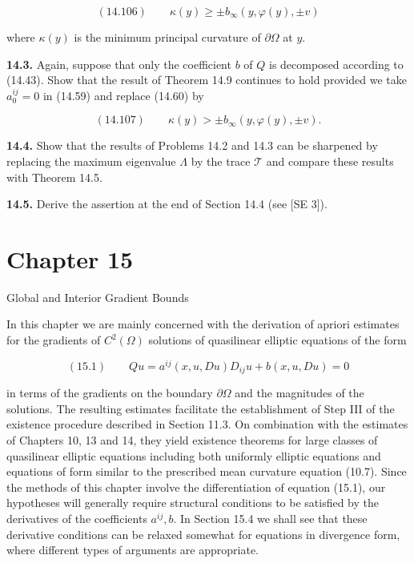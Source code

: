 \medskip

\begin{equation*}
(14.106)\qquad \kappa(y)\ge \pm b_{\infty}(y,\varphi(y),\pm v)
\end{equation*}

\noindent where $\kappa(y)$ is the minimum principal curvature of $\partial\Omega$ at $y$.

\medskip

\noindent\textbf{14.3.} Again, suppose that only the coefficient $b$ of $Q$ is decomposed according to (14.43). Show that the result of Theorem 14.9 continues to hold provided we take $a_{0}^{ij}=0$ in (14.59) and replace (14.60) by

\medskip

\begin{equation*}
(14.107)\qquad \kappa(y)> \pm b_{\infty}(y,\varphi(y),\pm v).
\end{equation*}

\medskip

\noindent\textbf{14.4.} Show that the results of Problems 14.2 and 14.3 can be sharpened by replacing the maximum eigenvalue $\Lambda$ by the trace $\mathcal{T}$ and compare these results with Theorem 14.5.

\medskip

\noindent\textbf{14.5.} Derive the assertion at the end of Section 14.4 (see [SE 3]).




\section*{Chapter 15}

\begin{center}
\LARGE Global and Interior Gradient Bounds
\end{center}

In this chapter we are mainly concerned with the derivation of apriori estimates
for the gradients of $C^2(\Omega)$ solutions of quasilinear elliptic equations of the form

\[
(15.1)\qquad Qu=a^{ij}(x,u,Du)D_{ij}u+b(x,u,Du)=0
\]

in terms of the gradients on the boundary $\partial\Omega$ and the magnitudes of the solutions.
The resulting estimates facilitate the establishment of Step III of the existence
procedure described in Section 11.3. On combination with the estimates of
Chapters 10, 13 and 14, they yield existence theorems for large classes of quasilinear
elliptic equations including both uniformly elliptic equations and equations of
form similar to the prescribed mean curvature equation (10.7). Since the methods
of this chapter involve the differentiation of equation (15.1), our hypotheses will
generally require structural conditions to be satisfied by the derivatives of the
coefficients $a^{ij}, b$. In Section 15.4 we shall see that these derivative conditions can be
relaxed somewhat for equations in divergence form, where different types of
arguments are appropriate.


